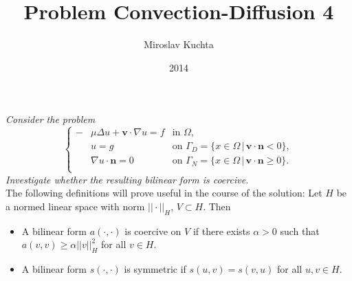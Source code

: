 \documentclass[a4paper,11pt,titlepage]{article}
\title{Problem Convection-Diffusion 4}
\author{Miroslav Kuchta}
\date{2014}
\newcommand{\VEC}[1]{\ensuremath{\textbf{#1}}}
\begin{document}
 


\textit{
Consider the problem 
\[
 \left\{ \begin{aligned}
	  -&\mu\Delta u + \VEC{v}\cdot\nabla u = f &\text{in}\,\,\Omega,\\
	  &u = g &\text{on}\,\,\Gamma_D = \{x\in\Omega\,|\,\VEC{v}\cdot\VEC{n} < 0\},\\
	  &\nabla u\cdot\VEC{n} = 0 &\text{on}\,\,\Gamma_N = \{x\in\Omega\,|\,\VEC{v}\cdot\VEC{n} \geq 0\}.\\
         \end{aligned}
 \right.
\]
Investigate whether the resulting bilinear form is coercive.}
\\

The following definitions will prove useful in the course of the solution:
\vskip 5pt
Let $H$ be a normed linear space with norm $||\cdot||_H$, $V\subset H$. Then 
\begin{itemize}
 \item[] A bilinear form $a(\cdot,\cdot)$ is coercive on $V$ if there exists $\alpha>0$ such that $a(v,v)\geq\alpha||v||^2_H$ for all $v\in H$.
 \item[] A bilinear form $s(\cdot,\cdot)$ is symmetric if $s(u,v)=s(v,u)$ for all $u,v\in H$.
\end{itemize}
\vskip 5pt
\end{document}
